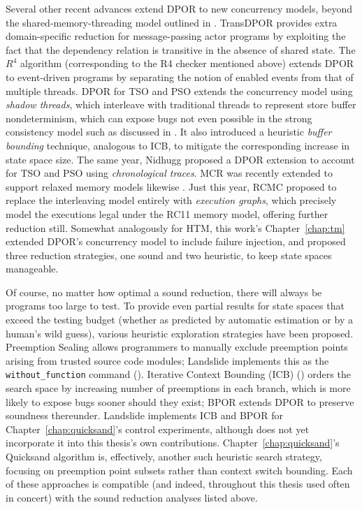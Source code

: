 Several other recent advances extend DPOR to new concurrency models,
beyond the shared-memory-threading model outlined in \sect{\ref{sec:landslide-dpor}}.
TransDPOR \cite{transdpor} provides extra domain-specific reduction for message-passing actor programs
by exploiting the fact that the dependency relation is transitive in the absence of shared state.
The $R^4$ algorithm \cite{r4} (corresponding to the R4 checker mentioned above)
extends DPOR to event-driven programs by separating the notion of enabled events from that of multiple threads.
DPOR for TSO and PSO \cite{tsopso}
extends the concurrency model
using {\em shadow threads}, which interleave with traditional threads to represent store buffer nondeterminism,
which can expose bugs not even possible in the strong consistency model
such as discussed in \sect{\ref{sec:tm-warpzone-relaxed}}.
It also introduced a heuristic {\em buffer bounding} technique, analogous to ICB,
to mitigate the corresponding increase in state space size.
The same year, Nidhugg \cite{nidhugg} proposed a DPOR extension to account for TSO and PSO
using {\em chronological traces}.
MCR was recently extended to support relaxed memory models likewise \cite{mcr-tsopso}.
Just this year, RCMC \cite{rcmc} proposed to replace the interleaving model entirely with {\em execution graphs},
which precisely model the executions legal under the RC11 memory model,
offering further reduction still.
Somewhat analogously for HTM, this work's Chapter~\ref{chap:tm}
extended DPOR's concurrency model to include failure injection,
and proposed three reduction strategies, one sound and two heuristic,
to keep state spaces manageable.

Of course, no matter how optimal a sound reduction, there will always be programs too large to test.
To provide even partial results for state spaces that exceed the testing budget
(whether as predicted by automatic estimation \cite{estimation} or by a human's wild guess),
various heuristic exploration strategies have been proposed.
Preemption Sealing \cite{sealing} allows programmers to manually exclude preemption points
arising from trusted source code modules;
Landslide implements this as the {\tt without\_function} command (\sect{\ref{sec:landslide-pps}}).
Iterative Context Bounding (ICB) \cite{chess-icb} (\sect{\ref{sec:landslide-icb}})
orders the search space by increasing number of preemptions in each branch,
which is more likely to expose bugs sooner should they exist;
BPOR \cite{bpor} extends DPOR to preserve soundness
thereunder. %
Landslide implements ICB and BPOR for Chapter~\ref{chap:quicksand}'s control experiments,
although does not yet incorporate it into this thesis's own contributions.
Chapter~\ref{chap:quicksand}'s Quicksand algorithm is, effectively, another such heuristic search strategy,
focusing on preemption point subsets rather than context switch bounding.
Each of these approaches is compatible (and indeed, throughout this thesis used often in concert)
with the sound reduction analyses listed above.

